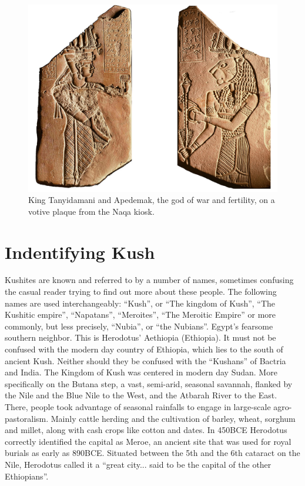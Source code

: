 \documentclass[a4paper,12pt]{scrreprt}
\begin{document}
\begin{figure}[H]
	\centering
	\includegraphics[width=\textwidth]{img/king_tanyidamani_and_apedemak}
	\caption{King Tanyidamani and Apedemak, the god of war and fertility, on a votive plaque from the Naqa kiosk.}
\end{figure}

\section{Indentifying Kush}

Kushites are known and referred to by a number of names, sometimes confusing the casual reader trying to find out more about these people. The following names are used interchangeably: “Kush”, or “The kingdom of Kush”, “The Kushitic empire”, “Napatans”, “Meroites”, “The Meroitic Empire” or more commonly, but less precisely, “Nubia”, or “the Nubians”. Egypt’s fearsome southern neighbor. This is Herodotus’ Aethiopia (Ethiopia). It must not be confused with the modern day country of Ethiopia, which lies to the south of ancient Kush. Neither should they be confused with the “Kushans” of Bactria and India. The Kingdom of Kush was centered in modern day Sudan. More specifically on the Butana step, a vast, semi-arid, seasonal savannah, flanked by the Nile and the Blue Nile to the West, and the Atbarah River to the East. There, people took advantage of seasonal rainfalls to engage in large-scale agro-pastoralism. Mainly cattle herding and the cultivation of barley, wheat, sorghum and millet, along with cash crops like cotton and dates. In 450BCE Herodotus correctly identified the capital as Meroe, an ancient site that was used for royal burials as early as 890BCE. Situated between the 5th and the 6th cataract on the Nile, Herodotus called it a “great city... said to be the capital of the other Ethiopians”.
\end{document}

